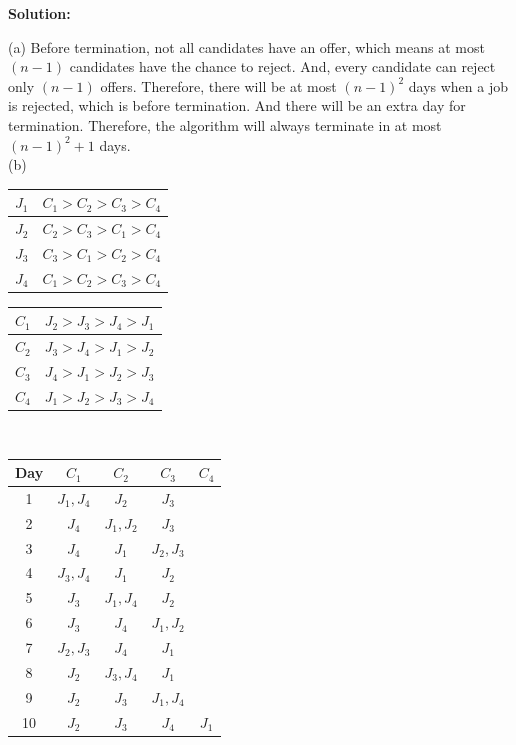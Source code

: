 \documentclass[12pt]{article}
\newenvironment{solution}{\par\noindent\textbf{Solution:}\par}{\par\vspace{1em}}
\begin{document}
\begin{solution}
    \noindent
    (a) Before termination, not all candidates have an offer, which means at most $(n-1)$ candidates have the chance to reject. 
    And, every candidate can reject only $(n-1)$ offers. Therefore, there will be at most $(n-1)^2$ days when a job is rejected, which is before termination.
    And there will be an extra day for termination. Therefore, the algorithm will always terminate in at most $(n-1)^2+1$ days.\\
    (b)
    \begin{tabular}{|c|c|}
        \hline
        $J_1$ & $C_1>C_2>C_3>C_4$\\
        \hline
        $J_2$ & $C_2>C_3>C_1>C_4$\\
        \hline
        $J_3$ & $C_3>C_1>C_2>C_4$\\
        \hline
        $J_4$ & $C_1>C_2>C_3>C_4$\\
        \hline
    \end{tabular}
    \begin{tabular}{|c|c|}
        \hline
        $C_1$ & $J_2>J_3>J_4>J_1$\\
        \hline
        $C_2$ & $J_3>J_4>J_1>J_2$\\
        \hline
        $C_3$ & $J_4>J_1>J_2>J_3$\\
        \hline
        $C_4$ & $J_1>J_2>J_3>J_4$\\
        \hline
    \end{tabular}\\
    \begin{tabular}{|c|c|c|c|c|}
        \hline
        Day & $C_1$ & $C_2$ & $C_3$ & $C_4$\\
        \hline
        1 & $J_1,J_4$ & $J_2$ & $J_3$ & \\
        \hline
        2 & $J_4$ & $J_1,J_2$ & $J_3$ & \\
        \hline
        3 & $J_4$ & $J_1$ & $J_2,J_3$ & \\
        \hline
        4 & $J_3,J_4$ & $J_1$ & $J_2$ & \\
        \hline
        5 & $J_3$ & $J_1,J_4$ & $J_2$ & \\
        \hline
        6 & $J_3$ & $J_4$ & $J_1,J_2$ & \\
        \hline
        7 & $J_2,J_3$ & $J_4$ & $J_1$ & \\
        \hline
        8 & $J_2$ & $J_3,J_4$ & $J_1$ & \\
        \hline
        9 & $J_2$ & $J_3$ & $J_1,J_4$ & \\
        \hline
        10 & $J_2$ & $J_3$ & $J_4$ & $J_1$\\
        \hline
    \end{tabular}
\end{solution}
\end{document}
